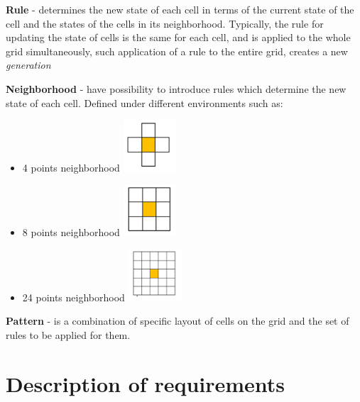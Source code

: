 \documentclass{article}
\begin{document}
\Large {\bf Rule
} 
	- determines the new state of each cell in terms of the current state
	of the cell and the states of the cells in its neighborhood.
	Typically, the rule for updating the state of cells is the same for each
	cell, and is applied to the whole grid simultaneously, such application of
	a rule to the entire grid, creates a new \textit{generation} \\

\newpage	

\Large {\bf Neighborhood
} 
	-  have possibility to introduce rules which determine the new state of 
	each cell. Defined under different environments such as:
	\begin{itemize}
	
	\item	
		4 points neighborhood \hspace{35pt} 
			 \includegraphics[width=20mm]{images/4_neigh.png} \\

	\item	
		8 points neighborhood \hspace{35pt}
			\includegraphics[width=20mm]{images/8_neigh.png} \\

	\item	
		24 points neighborhood \hspace{35pt}
			\includegraphics[width=20mm]{images/24_neigh.png} \\				
	\end{itemize}

\Large {\bf Pattern
} - is a combination of specific layout of cells on the grid and the set of rules to be applied for them.

\section{Description of requirements}
\end{document}
